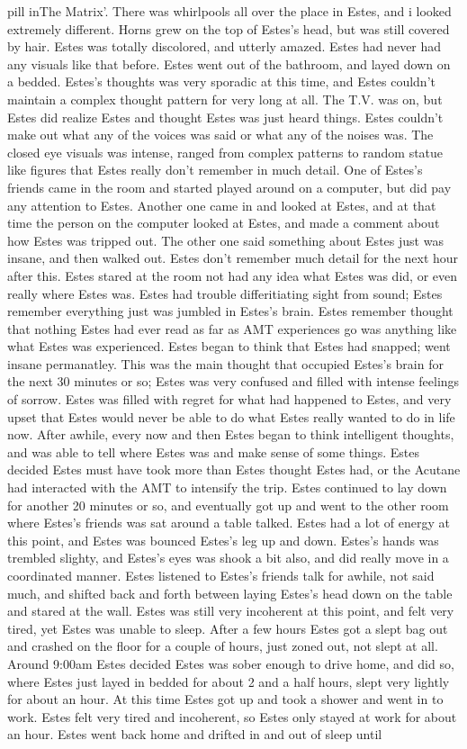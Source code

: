 \documentclass[12pt]{book}
\begin{document}
pill inThe Matrix'. There was whirlpools all over the place in Estes, and i looked extremely different. Horns grew on the top of Estes's head, but was still covered by hair. Estes was totally discolored, and utterly amazed. Estes had never had any visuals like that before. Estes went out of the bathroom, and layed down on a bedded. Estes's thoughts was very sporadic at this time, and Estes couldn't maintain a complex thought pattern for very long at all. The T.V. was on, but Estes did realize Estes and thought Estes was just heard things. Estes couldn't make out what any of the voices was said or what any of the noises was. The closed eye visuals was intense, ranged from complex patterns to random statue like figures that Estes really don't remember in much detail. One of Estes's friends came in the room and started played around on a computer, but did pay any attention to Estes. Another one came in and looked at Estes, and at that time the person on the computer looked at Estes, and made a comment about how Estes was tripped out. The other one said something about Estes just was insane, and then walked out. Estes don't remember much detail for the next hour after this. Estes stared at the room not had any idea what Estes was did, or even really where Estes was. Estes had trouble differitiating sight from sound; Estes remember everything just was jumbled in Estes's brain. Estes remember thought that nothing Estes had ever read as far as AMT experiences go was anything like what Estes was experienced. Estes began to think that Estes had snapped; went insane permanatley. This was the main thought that occupied Estes's brain for the next 30 minutes or so; Estes was very confused and filled with intense feelings of sorrow. Estes was filled with regret for what had happened to Estes, and very upset that Estes would never be able to do what Estes really wanted to do in life now. After awhile, every now and then Estes began to think intelligent thoughts, and was able to tell where Estes was and make sense of some things. Estes decided Estes must have took more than Estes thought Estes had, or the Acutane had interacted with the AMT to intensify the trip. Estes continued to lay down for another 20 minutes or so, and eventually got up and went to the other room where Estes's friends was sat around a table talked. Estes had a lot of energy at this point, and Estes was bounced Estes's leg up and down. Estes's hands was trembled slighty, and Estes's eyes was shook a bit also, and did really move in a coordinated manner. Estes listened to Estes's friends talk for awhile, not said much, and shifted back and forth between laying Estes's head down on the table and stared at the wall. Estes was still very incoherent at this point, and felt very tired, yet Estes was unable to sleep. After a few hours Estes got a slept bag out and crashed on the floor for a couple of hours, just zoned out, not slept at all. Around 9:00am Estes decided Estes was sober enough to drive home, and did so, where Estes just layed in bedded for about 2 and a half hours, slept very lightly for about an hour. At this time Estes got up and took a shower and went in to work. Estes felt very tired and incoherent, so Estes only stayed at work for about an hour. Estes went back home and drifted in and out of sleep until 
\end{document}
